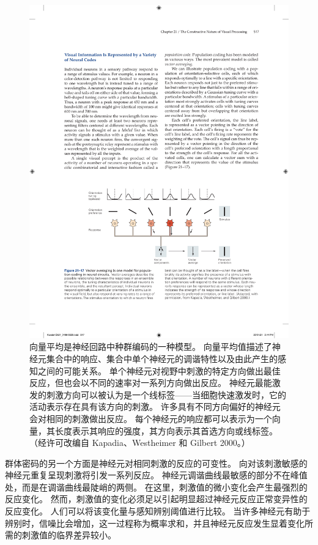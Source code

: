 \begin{figure}[htbp]
	\centering
	\includegraphics[width=1.0\linewidth]{chap21/fig_21_17}
	\caption{向量平均是神经回路中种群编码的一种模型。 
		向量平均值描述了神经元集合中的响应、集合中单个神经元的调谐特性以及由此产生的感知之间的可能关系。 
		单个神经元对视野中刺激的特定方向做出最佳反应，但也会以不同的速率对一系列方向做出反应。 
		神经元最能激发的刺激方向可以被认为是一个线标签——当细胞快速激发时，它的活动表示存在具有该方向的刺激。 
		许多具有不同方向偏好的神经元会对相同的刺激做出反应。 
		每个神经元的响应都可以表示为一个向量，其长度表示其响应的强度，其方向表示其首选方向或线标签。 （经许可改编自 Kapadia、Westheimer 和 Gilbert 2000。）}
	\label{fig:21_17}
\end{figure}

群体密码的另一个方面是神经元对相同刺激的反应的可变性。 
向对该刺激敏感的神经元重复呈现刺激将引发一系列反应。 
神经元调谐曲线最敏感的部分不在峰值处，而是在调谐曲线最陡峭的两侧。 
在这里，刺激值的微小变化会产生最强烈的反应变化。 
然而，刺激值的变化必须足以引起明显超过神经元反应正常变异性的反应变化。 
人们可以将该变化量与感知辨别阈值进行比较。 
当许多神经元有助于辨别时，信噪比会增加，这一过程称为概率求和，并且神经元反应发生显着变化所需的刺激值的临界差异较小。


